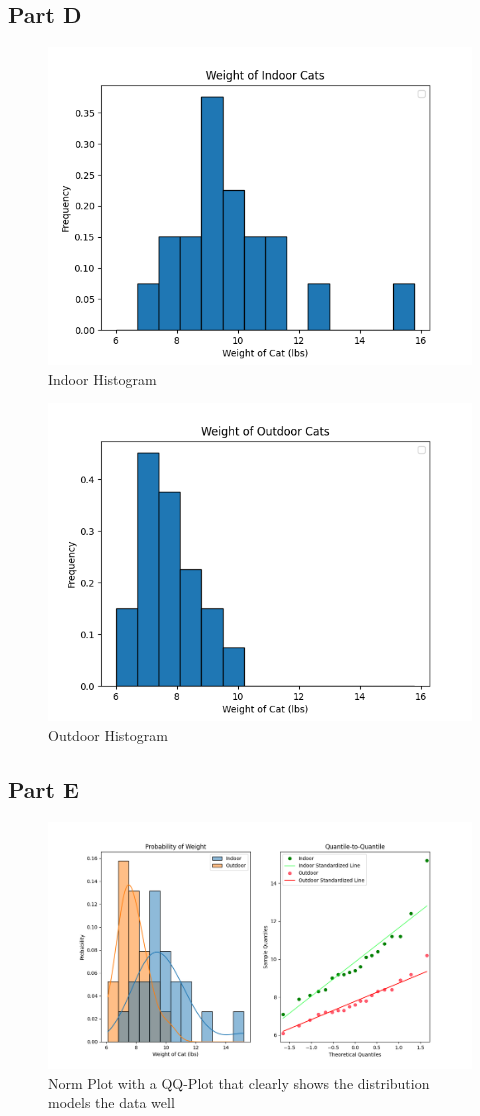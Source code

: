 \documentclass[]{report}
\begin{document}
\subsection{Part D}

\begin{figure}[H]
	\centering
	\includegraphics[width=0.7\linewidth]{pics/1.d.in}
	\caption{Indoor Histogram}
	\label{fig:2}
\end{figure}

\begin{figure}[H]
	\centering
	\includegraphics[width=0.7\linewidth]{pics/1.d.out}
	\caption{Outdoor Histogram}
	\label{fig:3}
\end{figure}

\subsection{Part E}

\begin{figure}[H]
	\centering
	\includegraphics[width=1\linewidth]{pics/1.e}
	\caption{Norm Plot with a QQ-Plot that clearly shows the distribution models the data well}
	\label{fig:4}
\end{figure}
\end{document}
